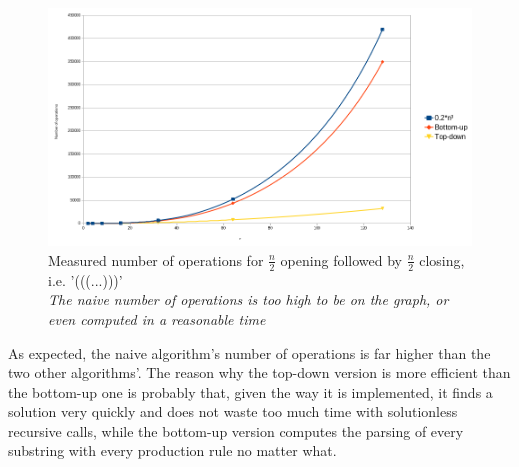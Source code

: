 \documentclass[12pt]{extarticle}
\begin{document}
\begin{figure}[h]
  \label{fig:plr}
  \centering
  \includegraphics[width=\textwidth]{paren/complexity_paren_lefts_rights}
  
  \caption{Measured number of operations for $\frac n2$ opening followed by
    $\frac n2$ closing, i.e. '(((...)))'\\
    \textit{The naive number of operations is too high to be on
             the graph, or even computed in a reasonable time}}
  
\end{figure}
\begin{multicols}{2}

As expected, the naive algorithm's number of operations is far higher than the two
other algorithms'. The reason why the top-down version is more efficient than the
bottom-up one is probably that,
given the way it is implemented, it finds a solution very quickly and does not
waste too much time with solutionless recursive calls, while the bottom-up
version computes the parsing of every substring with every production rule no
matter what.

\end{multicols}
\newpage
\end{document}
